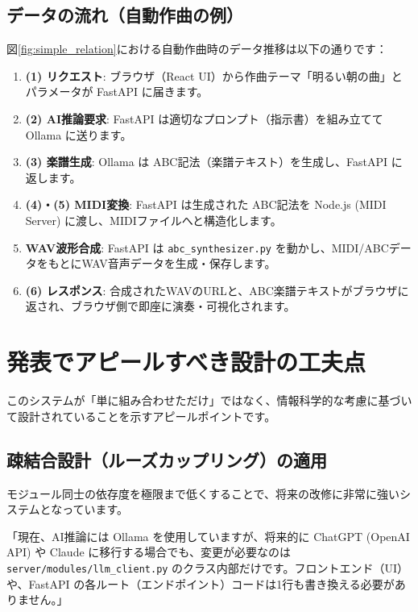 \documentclass[a4paper,11pt]{jlreq}
\newcommand{\file}[1]{\texttt{\color{brand-green}#1}}
\begin{document}
\subsection{データの流れ（自動作曲の例）}

図\ref{fig:simple_relation}における自動作曲時のデータ推移は以下の通りです：
\begin{enumerate}
  \item \textbf{(1) リクエスト}: ブラウザ（React UI）から作曲テーマ「明るい朝の曲」とパラメータが FastAPI に届きます。
  \item \textbf{(2) AI推論要求}: FastAPI は適切なプロンプト（指示書）を組み立てて Ollama に送ります。
  \item \textbf{(3) 楽譜生成}: Ollama は ABC記法（楽譜テキスト）を生成し、FastAPI に返します。
  \item \textbf{(4)・(5) MIDI変換}: FastAPI は生成された ABC記法を Node.js (MIDI Server) に渡し、MIDIファイルへと構造化します。
  \item \textbf{WAV波形合成}: FastAPI は \file{abc\_synthesizer.py} を動かし、MIDI/ABCデータをもとにWAV音声データを生成・保存します。
  \item \textbf{(6) レスポンス}: 合成されたWAVのURLと、ABC楽譜テキストがブラウザに返され、ブラウザ側で即座に演奏・可視化されます。
\end{enumerate}

\newpage

\section{発表でアピールすべき設計の工夫点}

このシステムが「単に組み合わせただけ」ではなく、情報科学的な考慮に基づいて設計されていることを示すアピールポイントです。

\subsection{疎結合設計（ルーズカップリング）の適用}

モジュール同士の依存度を極限まで低くすることで、将来の改修に非常に強いシステムとなっています。
\begin{tcolorbox}[pointbox, title=アピール例: AIエンジンの差し替え]
「現在、AI推論には Ollama を使用していますが、将来的に ChatGPT (OpenAI API) や Claude に移行する場合でも、変更が必要なのは \file{server/modules/llm\_client.py} のクラス内部だけです。フロントエンド（UI）や、FastAPI の各ルート（エンドポイント）コードは1行も書き換える必要がありません。」
\end{tcolorbox}
\end{document}
